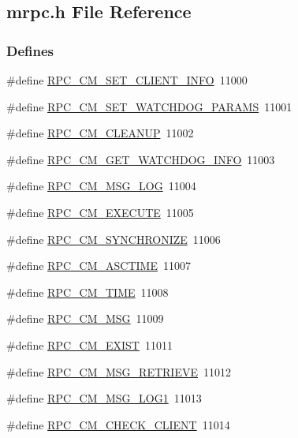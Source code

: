 \subsection{mrpc.h File Reference}
\label{mrpc_8h}
\subsubsection*{Defines}
\begin{DoxyCompactItemize}
\item 
\#define \hyperlink{group__mrpcdefineh_ga31120a65ddf8e807d5722fb30fcfb717}{RPC\_\-CM\_\-SET\_\-CLIENT\_\-INFO}~11000
\item 
\#define \hyperlink{group__mrpcdefineh_gacf26660c68ca2cf0717213226e9048f1}{RPC\_\-CM\_\-SET\_\-WATCHDOG\_\-PARAMS}~11001
\item 
\#define \hyperlink{group__mrpcdefineh_gaeddbbd744c03a8990102d06e4b525d4c}{RPC\_\-CM\_\-CLEANUP}~11002
\item 
\#define \hyperlink{group__mrpcdefineh_gaf64b3d2c73048e4ca07a5aa8bb70c326}{RPC\_\-CM\_\-GET\_\-WATCHDOG\_\-INFO}~11003
\item 
\#define \hyperlink{group__mrpcdefineh_gacf43c40575a236cae5e83a9380f964e7}{RPC\_\-CM\_\-MSG\_\-LOG}~11004
\item 
\#define \hyperlink{group__mrpcdefineh_gae75588700fd5b48de1640563e74ae4c5}{RPC\_\-CM\_\-EXECUTE}~11005
\item 
\#define \hyperlink{group__mrpcdefineh_ga24e35d6645a1fc940b10523bc4061b23}{RPC\_\-CM\_\-SYNCHRONIZE}~11006
\item 
\#define \hyperlink{group__mrpcdefineh_ga1a312b4bf66e355c7508e611485b65e0}{RPC\_\-CM\_\-ASCTIME}~11007
\item 
\#define \hyperlink{group__mrpcdefineh_ga087c4a9e16ed585101f90c1417ce3e8e}{RPC\_\-CM\_\-TIME}~11008
\item 
\#define \hyperlink{group__mrpcdefineh_ga61050d4425a71753c645d94cb280d7f6}{RPC\_\-CM\_\-MSG}~11009
\item 
\#define \hyperlink{group__mrpcdefineh_ga0d45be0755215931e2d4aceb91df38cf}{RPC\_\-CM\_\-EXIST}~11011
\item 
\#define \hyperlink{group__mrpcdefineh_gada6c0b63689032378b7ef710ec5793c2}{RPC\_\-CM\_\-MSG\_\-RETRIEVE}~11012
\item 
\#define \hyperlink{group__mrpcdefineh_gad4f6e60f24b227405abd4e5394693092}{RPC\_\-CM\_\-MSG\_\-LOG1}~11013
\item 
\#define \hyperlink{group__mrpcdefineh_ga15efc37e61154a6f4f4e52e852b8d858}{RPC\_\-CM\_\-CHECK\_\-CLIENT}~11014

\end{DoxyCompactItemize}
